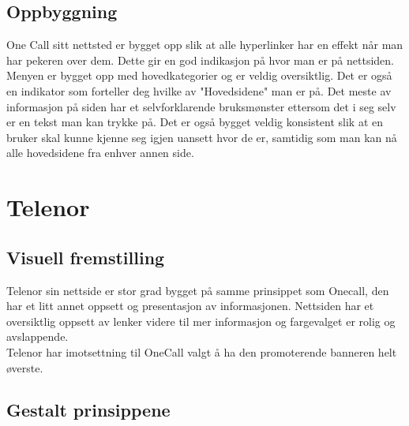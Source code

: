 \documentclass[a4paper, 10pt]{article}
\begin{document}
\subsection*{Oppbyggning}
One Call sitt nettsted er bygget opp slik at alle hyperlinker har en effekt når man har pekeren over dem. Dette gir en god indikasjon på hvor man er på nettsiden. Menyen er bygget opp med hovedkategorier og er veldig oversiktlig. Det er også en indikator som forteller deg hvilke av "Hovedsidene" man er på. Det meste av informasjon på siden har et selvforklarende bruksmønster ettersom det i seg selv er en tekst man kan trykke på. Det er også bygget veldig konsistent slik at en bruker skal kunne kjenne seg igjen uansett hvor de er, samtidig som man kan nå alle hovedsidene fra enhver annen side.


\newpage
\section*{Telenor}
\subsection*{Visuell fremstilling}
Telenor sin nettside er stor grad bygget på samme prinsippet som Onecall, den har et litt annet oppsett og presentasjon av informasjonen. Nettsiden har et oversiktlig oppsett av lenker videre til mer informasjon og fargevalget er rolig og avslappende.\\
Telenor har imotsettning til OneCall valgt å ha den promoterende banneren helt øverste.


\subsection*{Gestalt prinsippene}
\end{document}
